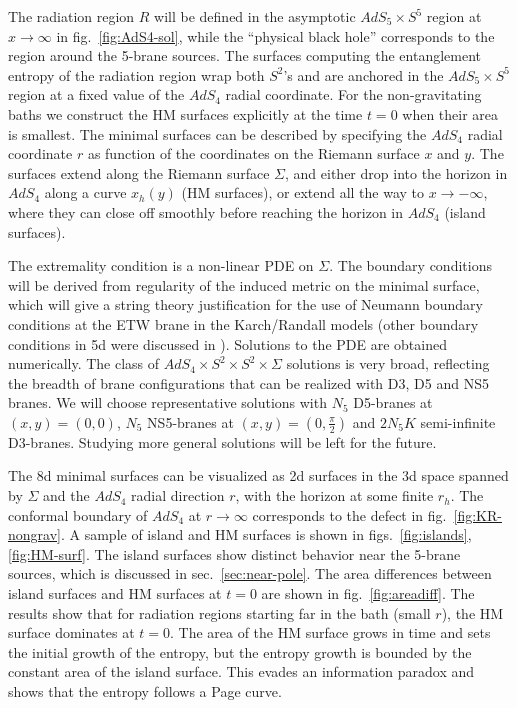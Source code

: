 \documentclass[aps,prd,11pt,notitlepage,longbibliography,nofootinbib,tightenlines,preprintnumbers]{revtex4-1}
\begin{document}
The radiation region $R$ will be defined in the asymptotic $AdS_5\times S^5$ region at $x\rightarrow\infty$ in fig.~\ref{fig:AdS4-sol}, while the ``physical black hole'' corresponds to the region around the 5-brane sources.
The surfaces computing the entanglement entropy of the radiation region wrap both $S^2$'s and are anchored in the $AdS_5\times S^5$ region at a fixed value of the $AdS_4$ radial coordinate. 
For the non-gravitating baths we construct the HM surfaces explicitly at the time $t=0$ when their area is smallest.
The minimal surfaces can be described by specifying the $AdS_4$ radial coordinate $r$ as function of the coordinates on the Riemann surface $x$ and $y$.
The surfaces extend along the Riemann surface $\Sigma$, and either drop into the horizon in $AdS_4$ along a curve $x_h(y)$ (HM surfaces), or extend all the way to $x\rightarrow -\infty$, where they can close off smoothly before reaching the horizon in $AdS_4$ (island surfaces).

The extremality condition is a non-linear PDE on $\Sigma$. 
The boundary conditions will be derived from regularity of the induced metric on the minimal surface,
which will give a string theory justification for the use of Neumann boundary conditions at the ETW brane in the Karch/Randall models (other boundary conditions in 5d were discussed in \cite{Ghosh:2021axl}).
Solutions to the PDE are obtained numerically.
The class of $AdS_4\times S^2\times S^2\times \Sigma$ solutions is very broad, reflecting the breadth of brane configurations that can be realized with D3, D5 and NS5 branes.
We will choose representative solutions with $N_5$ D5-branes at $(x,y)=(0,0)$, $N_5$ NS5-branes at $(x,y)=(0,\frac{\pi}{2})$ and $2N_5K$ semi-infinite D3-branes. Studying more general solutions will be left for the future.

The 8d minimal surfaces can be visualized as 2d surfaces in the 3d space spanned by $\Sigma$ and the $AdS_4$ radial direction $r$,
with the horizon at some finite $r_h$. The conformal boundary of $AdS_4$ at $r\rightarrow\infty$ corresponds to the defect in fig.~\ref{fig:KR-nongrav}.
A sample of island and HM surfaces is shown in figs.~\ref{fig:islands}, \ref{fig:HM-surf}.
The island surfaces show distinct behavior near the 5-brane sources, which is discussed in sec.~\ref{sec:near-pole}.
The area differences between island surfaces and HM surfaces at $t=0$ are shown in fig.~\ref{fig:areadiff}. 
%
The results show that for radiation regions starting far in the bath (small $r$), the HM surface dominates at $t=0$.
The area of the HM surface grows in time and sets the initial growth of the entropy, but the entropy growth is bounded by the constant area of the island surface. 
This evades an information paradox and shows that the entropy follows a Page curve.
\end{document}
